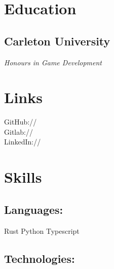 \documentclass[]{deedy-resume-openfont}
\begin{document}
\vspace*{10pt}


%
%

\begin{minipage}[t]{0.33\textwidth}

\section{Education}

\subsection{Carleton University}
\textit{Honours in Game Development}
\sectionsep

\section{Links}

\sectionsep

GitHub:// \href{https://github.com/AngelOnFira}{}\\

Gitlab:// \href{https://gitlab.com/AngelOnFira}{}\\

LinkedIn://  \href{https://www.linkedin.com/in/forest-anderson}{}

\sectionsep

\section{Skills}

\subsection{Languages:}
\sectionsep

Rust \textbullet{} Python \textbullet{} Typescript \\

\sectionsep
\subsection{Technologies:}
\sectionsep


\end{minipage}
\end{document}
